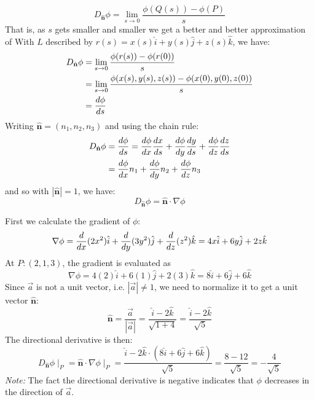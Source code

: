 \documentclass[a4paper, 10pt]{article}
\begin{document}
$$D_{\hat{\mathbf{n}}} \phi = \lim_{s \to 0} \frac{\phi(Q(s)) - \phi(P)}{s}$$
That is, as $s$ gets smaller and smaller we get a better and better approximation of
With $L$ described by $r(s) = x(s) \hat{i} + y(s) \hat{j} + z(s) \hat{k}$, we have:
\begin{align*}
  D_{\hat{\mathbf{n}}} \phi & = \lim_{s \to 0} \frac{\phi(r(s)) - \phi(r(0))}{s}                         \\
                            & = \lim_{s \to 0} \frac{\phi(x(s), y(s), z(s)) - \phi(x(0), y(0), z(0))}{s} \\
                            & = \frac{d\phi}{ds}
\end{align*}
Writing $\hat{\mathbf{n}} = (n_1, n_2, n_3)$ and using the chain rule:
\begin{align}
  D_{\hat{\mathbf{n}}} \phi & = \frac{d\phi}{ds} = \frac{d\phi}{dx} \frac{dx}{ds} + \frac{d\phi}{dy} \frac{dy}{ds} + \frac{d\phi}{dz} \frac{dz}{ds} \nonumber \\
                            & = \frac{d\phi}{dx} n_1 + \frac{d\phi}{dy} n_2 + \frac{d\phi}{dz} n_3
\end{align}
and so with $|\hat{\mathbf{n}}| = 1$, we have:
$$D_{\hat{\mathbf{n}}} \phi = \hat{\mathbf{n}} \cdot \nabla \phi $$

\begin{examplebox}[Find the directional derivative of $\phi(x,y,z) = 2x^2 + 3y^2 + z^2$ at the point
    $P: : (2,1,3)$ in the direction of the vector $\vec{a} = \hat{i} - 2\hat{k}$]
  First we calculate the gradient of $\phi$:
  $$\nabla \phi = \frac{d}{dx}(2x^2) \hat{i} + \frac{d}{dy}(3y^2) \hat{j} + \frac{d}{dz}(z^2) \hat{k} = 4x \hat{i} + 6y \hat{j} + 2z \hat{k}$$
  At $P : (2,1,3)$, the gradient is evaluated as
  $$\nabla \phi = 4(2) \hat{i} + 6(1) \hat{j} + 2(3) \hat{k} = 8 \hat{i} + 6 \hat{j} + 6 \hat{k}$$
  Since $\vec{a}$ is not a unit vector, i.e. $|\vec{a}| \neq 1$, we need to normalize it to get a unit vector $\hat{\mathbf{n}}$:
  $$\hat{\mathbf{n}} = \frac{\vec{a}}{|\vec{a}|} = \frac{\hat{i} - 2\hat{k}}{\sqrt{1 + 4}} = \frac{\hat{i} - 2\hat{k}}{\sqrt{5}}$$
  The directional derivative is then:
  $$D_{\hat{\mathbf{n}}} \phi \mid_P = \hat{\mathbf{n}} \cdot \nabla \phi\mid_P = \frac{\hat{i} - 2\hat{k} \cdot (8\hat{i} + 6\hat{j} + 6\hat{k})}{\sqrt{5}} = \frac{8 - 12}{\sqrt{5}} = -\frac{4}{\sqrt{5}}$$
  \emph{Note:} The fact the directional derivative is negative indicates that $\phi$ decreases in the direction of $\vec{a}$.
\end{examplebox}
\pagebreak
\end{document}
